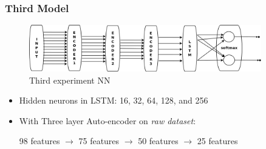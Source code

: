 \documentclass{beamer}
\begin{document}
\begin{frame}
\frametitle{Third Model}
\begin{figure}[t!]
    \centering
    \includegraphics[width=0.9\textwidth]{../paper/pictures/figures/exp_NN3.png}
    \caption{Third experiment NN}
    \label{fig:exp_NN3}
\end{figure}

\begin{itemize}
\item Hidden neurons in LSTM: 16, 32, 64, 128, and 256
\item With Three layer Auto-encoder on {\em raw dataset}:

98 features $\rightarrow$ 75 features $\rightarrow$ 50 features $\rightarrow$ 25 features
\end{itemize}
\end{frame}
\end{document}
